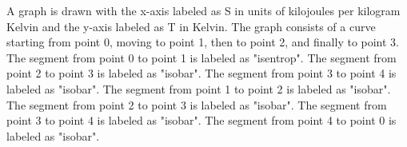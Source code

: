 A graph is drawn with the x-axis labeled as S in units of kilojoules per kilogram Kelvin and the y-axis labeled as T in Kelvin. The graph consists of a curve starting from point 0, moving to point 1, then to point 2, and finally to point 3. The segment from point 0 to point 1 is labeled as "isentrop". The segment from point 2 to point 3 is labeled as "isobar". The segment from point 3 to point 4 is labeled as "isobar". The segment from point 1 to point 2 is labeled as "isobar". The segment from point 2 to point 3 is labeled as "isobar". The segment from point 3 to point 4 is labeled as "isobar". The segment from point 4 to point 0 is labeled as "isobar".
